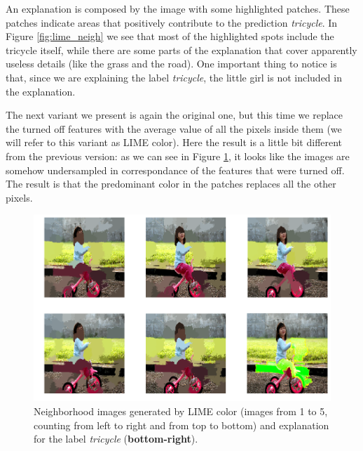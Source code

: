 \documentclass[12pt, twoside, a4paper]{report}
\begin{document}
An explanation is composed by the image with some highlighted patches. These patches indicate areas that positively contribute to the prediction \emph{tricycle}. In Figure \ref{fig:lime_neigh} we see that most of the highlighted spots include the tricycle itself, while there are some parts of the explanation that cover apparently useless details (like the grass and the road). 
One important thing to notice is that, since we are explaining the label \emph{tricycle}, the little girl is not included in the explanation.


\bigskip

The next variant we present is again the original one, but this time we replace the turned off features with the average value of all the pixels inside them (we will refer to this variant as LIME color). Here the result is a little bit different from the previous version: as we can see in Figure \ref{fig:limecolor_neigh}, it looks like the images are somehow undersampled in correspondance of the features that were turned off. The result is that the predominant color in the patches replaces all the other pixels.

\begin{figure}
\begin{center}
\includegraphics[width = .85\textwidth]{images/limecolor_neighborhood.png} 
\caption{Neighborhood images generated by LIME color (images from 1 to 5, counting from left to right and from top to bottom) and explanation for the label \textit{tricycle} (\textbf{bottom-right}).}
\label{fig:limecolor_neigh}
\end{center}
\end{figure}
\end{document}
